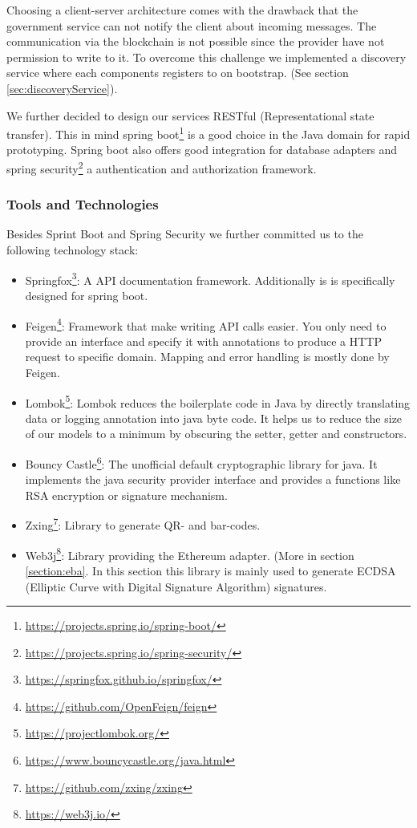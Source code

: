 Choosing a client-server architecture comes with the drawback that the government service can not notify the client about incoming messages. The communication via the blockchain is not possible since the provider have not permission to write to it. To overcome this challenge we implemented a discovery service where each components registers to on bootstrap. (See section \ref{sec:discoveryService}).

We further decided to design our services RESTful (Representational state transfer). This in mind spring boot\footnote{\url{https://projects.spring.io/spring-boot/}} is a good choice in the Java domain for rapid prototyping. Spring boot also offers good integration for database adapters and spring security\footnote{\url{https://projects.spring.io/spring-security/}} a authentication and authorization framework. 

\subsubsection{Tools and Technologies}
Besides Sprint Boot and Spring Security we further committed us to the following technology stack: 

\begin{itemize}
\item Springfox\footnote{\url{https://springfox.github.io/springfox/}}: A API documentation framework. Additionally is is specifically designed for spring boot.
\item Feigen\footnote{\url{https://github.com/OpenFeign/feign}}: Framework that make writing API calls easier. You only need to provide an interface and specify it with annotations to produce a HTTP request to specific domain. Mapping and error handling is mostly done by Feigen. 
\item Lombok\footnote{\url{https://projectlombok.org/}}: Lombok reduces the boilerplate code in Java by directly translating data or logging annotation into java byte code. It helps us to reduce the size of our models to a minimum by obscuring the setter, getter and constructors. 
\item Bouncy Castle\footnote{\url{https://www.bouncycastle.org/java.html}}: The unofficial default cryptographic library for java. It implements the java security provider interface and provides a functions like RSA encryption or signature mechanism.
\item Zxing\footnote{\url{https://github.com/zxing/zxing}}: Library to generate QR- and bar-codes. 
\item Web3j\footnote{\url{https://web3j.io/}}: Library providing the Ethereum adapter. (More in section \ref{section:eba}. In this section this library is mainly used to generate ECDSA (Elliptic Curve with Digital Signature Algorithm) signatures. 
\end{itemize}

